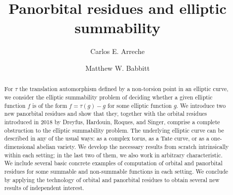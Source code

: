 \documentclass[preprint,12pt]{elsarticle}
\numberwithin{equation}{section} %
\theoremstyle{theorem}
\theoremstyle{definition}
\begin{document}
\begin{frontmatter}


\title{Panorbital residues and elliptic summability}
\author{Carlos E. Arreche}  \author{Matthew W. Babbitt} 
\address{Department of Mathematical Sciences, The University of Texas at Dallas}



\begin{abstract}

 For $\tau$ the translation automorphism defined by a non-torsion point in an elliptic curve, we consider the elliptic summability problem of deciding whether a given elliptic function $f$ is of the form $f=\tau(g)-g$ for some elliptic function $g$. We introduce two new panorbital residues and show that they, together with the orbital residues introduced in 2018 by Dreyfus, Hardouin, Roques, and Singer, comprise a complete obstruction to the elliptic summability problem. The underlying elliptic curve can be described in any of the usual ways: as a complex torus, as a Tate curve, or as a one-dimensional abelian variety. We develop the necessary results from scratch intrinsically within each setting; in the last two of them, we also work in arbitrary characteristic. We include several basic concrete examples of computation of orbital and panorbital residues for some summable and non-summable functions in each setting. We conclude by applying the technology of orbital and panorbital residues to obtain several new results of independent interest.


\end{abstract}
\end{frontmatter}
\end{document}
